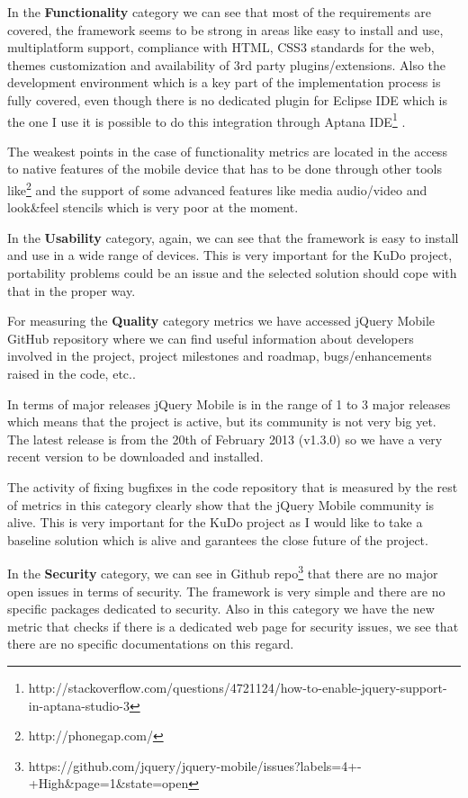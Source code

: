 \documentclass[a4paper,12pt]{book}
\begin{document}
In the \textbf{Functionality} category we can see that most of the requirements are covered, the framework seems to be strong in areas like easy to install and use, multiplatform support, compliance with HTML, CSS3 standards for the web, themes customization and availability of 3rd party plugins/extensions. Also the development environment which is a key part of the implementation process is fully covered, even though there is no dedicated plugin for Eclipse IDE which is the one I use it is possible to do this integration through Aptana IDE\footnote{http://stackoverflow.com/questions/4721124/how-to-enable-jquery-support-in-aptana-studio-3} .

The weakest points in the case of functionality metrics are located in the access to native features of the mobile device that has to be done through other tools like\footnote{http://phonegap.com/} and the support of some advanced features like media audio/video and look\&feel stencils which is very poor at the moment.

In the \textbf{Usability} category, again, we can see that the framework is easy to install and use in a wide range of devices. This is very important for the KuDo project, portability problems could be an issue and the selected solution should cope with that in the proper way.

For measuring the \textbf{Quality} category metrics we have accessed jQuery Mobile GitHub repository\cite{jQuery Mobile Github repo} where we can find useful information about developers involved in the project, project milestones and roadmap, bugs/enhancements raised in the code, etc..

In terms of major releases jQuery Mobile is in the range of 1 to 3 major releases which means that the project is active, but its community is not very big yet. The latest release is from the 20th of February 2013 (v1.3.0) so we have a very recent version to be downloaded and installed.

The activity of fixing bugfixes in the code repository that is measured by the rest of metrics in this category clearly show that the jQuery Mobile community is alive. This is very important for the KuDo project as I would like to take a baseline solution which is alive and garantees the close future of the project.

In the \textbf{Security} category, we can see in Github repo\footnote{https://github.com/jquery/jquery-mobile/issues?labels=4+-+High\&page=1\&state=open}  that there are no major open issues in terms of security. The framework is very simple and there are no specific packages dedicated to security. Also in this category we have the new metric that checks if there is a dedicated web page for security issues, we see that there are no specific documentations on this regard.
\end{document}
